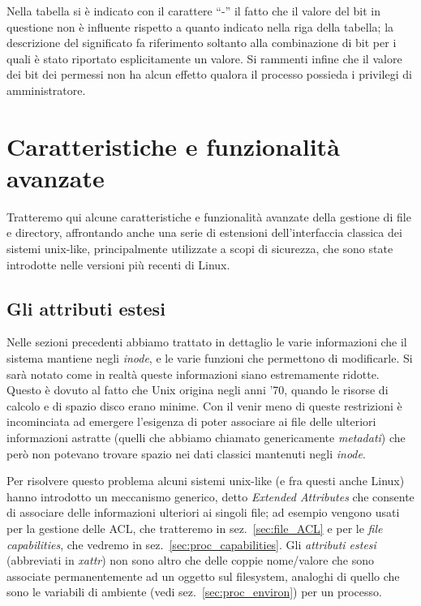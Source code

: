 Nella tabella si è indicato con il carattere ``-'' il fatto che il valore del
bit in questione non è influente rispetto a quanto indicato nella riga della
tabella; la descrizione del significato fa riferimento soltanto alla
combinazione di bit per i quali è stato riportato esplicitamente un valore.
Si rammenti infine che il valore dei bit dei permessi non ha alcun effetto
qualora il processo possieda i privilegi di amministratore.


\section{Caratteristiche e funzionalità avanzate}
\label{sec:file_dir_advances}

Tratteremo qui alcune caratteristiche e funzionalità avanzate della gestione
di file e directory, affrontando anche una serie di estensioni
dell'interfaccia classica dei sistemi unix-like, principalmente utilizzate a
scopi di sicurezza, che sono state introdotte nelle versioni più recenti di
Linux.

\subsection{Gli attributi estesi}
\label{sec:file_xattr}


Nelle sezioni precedenti abbiamo trattato in dettaglio le varie informazioni
che il sistema mantiene negli \textit{inode}, e le varie funzioni che
permettono di modificarle.  Si sarà notato come in realtà queste informazioni
siano estremamente ridotte.  Questo è dovuto al fatto che Unix origina negli
anni '70, quando le risorse di calcolo e di spazio disco erano minime. Con il
venir meno di queste restrizioni è incominciata ad emergere l'esigenza di
poter associare ai file delle ulteriori informazioni astratte (quelli che
abbiamo chiamato genericamente \textsl{metadati}) che però non potevano
trovare spazio nei dati classici mantenuti negli \textit{inode}.

Per risolvere questo problema alcuni sistemi unix-like (e fra questi anche
Linux) hanno introdotto un meccanismo generico, detto \textit{Extended
  Attributes} che consente di associare delle informazioni ulteriori ai
singoli file; ad esempio vengono usati per la gestione delle ACL, che
tratteremo in sez.~\ref{sec:file_ACL} e per le \textit{file capabilities}, che
vedremo in sez.~\ref{sec:proc_capabilities}. Gli \textsl{attributi estesi}
(abbreviati in \textsl{xattr}) non sono altro che delle coppie nome/valore che
sono associate permanentemente ad un oggetto sul filesystem, analoghi di
quello che sono le variabili di ambiente (vedi sez.~\ref{sec:proc_environ})
per un processo.

